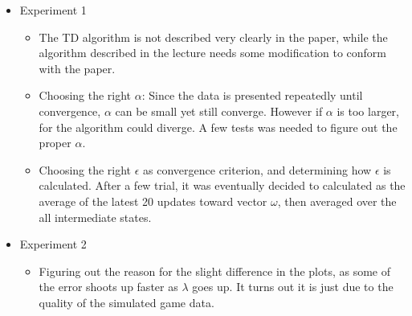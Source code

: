 \documentclass[10pt]{article}
\begin{document}
   	\begin{itemize}
     		\item  Experiment 1
     			\begin{itemize}
					\item The TD algorithm is not described very clearly in the paper, while the algorithm described in the lecture needs some modification to conform with the paper.
       				\item Choosing the right $\alpha$: Since the data is presented repeatedly until convergence, $\alpha$ can be small yet still converge. However if $\alpha$ is too larger, for the algorithm could diverge. A few tests was needed to figure out the proper $\alpha$.
					\item Choosing the right $\epsilon$ as convergence criterion, and determining how $\epsilon$ is calculated. After a few trial, it was eventually decided to calculated as the average of the latest 20 updates toward vector $\omega$, then averaged over the all intermediate states.
    			 \end{itemize}
		     \item  Experiment 2
    			 \begin{itemize}
    				   \item Figuring out the reason for the slight difference in the plots, as some of the error shoots up faster as $\lambda$ goes up. It turns out it is just due to the quality of the simulated game data.
       				   
     			 \end{itemize}
	\end{itemize}









\end{document}
